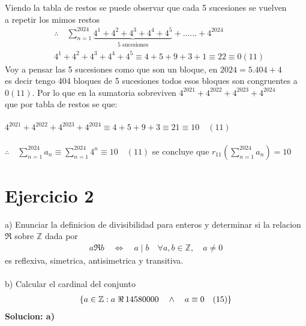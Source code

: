 \documentclass[12pt,a4paper]{article}
\begin{document}
Viendo la tabla de restos se puede observar que cada 5 sucesiones se vuelven \\
a repetir los mimos restos
\begin{align*}
&\therefore \quad \sum_{n=1}^{2024} \underbrace{4^1 + 4^2 + 4^3 + 4^4 + 4^5}_{\text{5 sucesiones}}  + \ldots \ldots  
+ 4^{2024} \\ 
&4^1 + 4^2 + 4^3 + 4^4 + 4^5 \equiv 4 + 5 + 9 + 3 + 1 \equiv 22 \equiv 0 (11) 
\end{align*}
Voy a pensar las 5 sucesiones como que son un bloque, en $2024 = 5.404 + 4$ \\
es decir tengo 404 bloques de 5 sucesiones todos esos bloques son congruentes a $0 (11)$.
Por lo que en la sumatoria sobreviven $4^{2021} + 4^{2022} + 4^{2023} + 4^{2024}$ \\
que por tabla de restos se que: \\ \\ $4^{2021} + 4^{2022} + 4^{2023} + 4^{2024} \equiv 4 + 5
+ 9 + 3 \equiv 21 \equiv 10 \quad (11)$ \\ \\
$\therefore \quad \sum_{n=1}^{2024} a_n \equiv \sum_{n=1}^{2024} 4^n \equiv 10 \quad (11)$  \hspace{15px}se concluye que  $r_{11}(\sum_{n=1}^{2024} a_n) = 10$

\section{Ejercicio 2}
a) Enunciar la definicion de divisibilidad para enteros y determinar si la relacion \\
$\Re$ sobre $\mathbb{Z}$ dada por
\begin{align*}
    a \Re b \quad \Longleftrightarrow \quad a \mid b \quad \forall a,b \in \mathbb{Z}, \quad a \neq 0
\end{align*}
es reflexiva, simetrica, antisimetrica y transitiva. \\ \\
b) Calcular el cardinal del conjunto
\begin{align*}
    \{a \in \mathbb{Z}: a \hspace{3px} \Re \hspace{2px}14580000 \quad \land \quad a \equiv 0 \quad(15)\}
\end{align*}
\textbf{Solucion: a)} \\
\end{document}
